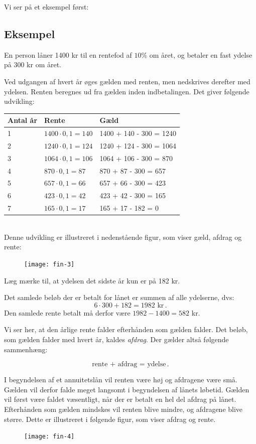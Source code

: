 \documentclass[12pt,oneside,a4paper]{article}
\begin{document}
Vi ser på et eksempel først:
\begin{tcolorbox}
\subsection*{Eksempel}
En person låner 1400 kr til en rentefod af $10\%$ om året, og betaler en fast
ydelse på 300 kr om året.

Ved udgangen af hvert år øges gælden med renten, men nedskrives derefter med
ydelsen. Renten beregnes ud fra gælden inden indbetalingen.  Det giver
følgende udvikling:
\\

\begin{tabular}{|l|l|l|}
    \hline
    \textbf{Antal år} & \textbf{Rente} & \textbf{Gæld} \\
    \hline
    1 & $1400\cdot 0,1 = 140$ & 1400 + 140 - 300 = 1240 \\
    \hline
    2 & $1240\cdot 0,1 = 124$ & 1240 + 124 - 300 = 1064 \\
    \hline
    3 & $1064\cdot 0,1 = 106$ & 1064 + 106 - 300 =  870 \\
    \hline
    4 & $870\cdot 0,1 = 87$ & 870 + 87 - 300 = 657 \\
    \hline
    5 & $657\cdot 0,1 = 66$ & 657 + 66 - 300 = 423 \\
    \hline
    6 & $423\cdot 0,1 = 42$ & 423 + 42 - 300 = 165 \\
    \hline
    7 & $165\cdot 0,1 = 17$ & 165 + 17 - 182 = 0 \\
    \hline
\end{tabular}
\\

Denne udvikling er illustreret i nedenstående figur, som viser gæld, afdrag og rente:
\begin{figure}[H]
    \centering
    \texttt{[image: fin-3]}
\end{figure}

Læg mærke til, at ydelsen det sidste år kun er på 182 kr.

Det samlede beløb der er betalt for lånet er summen af alle ydelserne, dvs:
\[
6\cdot 300 + 182 = 1982 \,\,\mbox{kr}\,.
\]
Den samlede rente betalt må derfor være $1982 - 1400 = 582$ kr.

\end{tcolorbox}

Vi ser her, at den årlige rente falder efterhånden som gælden falder. Det
beløb, som gælden falder med hvert år, kaldes \emph{afdrag}. Der gælder
altså følgende sammenhæng:
\begin{tcolorbox}
\[
\mbox{rente + afdrag = ydelse}\,.
\]
\end{tcolorbox}
I begyndelsen af et annuitetslån vil renten være høj og afdragene være små.
Gælden vil derfor falde meget langsomt i begyndelsen af lånets løbetid.  Gælden
vil først være faldet væsentligt, når der er betalt en hel del afdrag på lånet.
Efterhånden som gælden mindskes vil renten blive mindre, og afdragene blive
større. Dette er illustreret i følgende figur, som viser afdrag og rente.
\begin{figure}[H]
    \centering
    \texttt{[image: fin-4]}
\end{figure}
\end{document}
